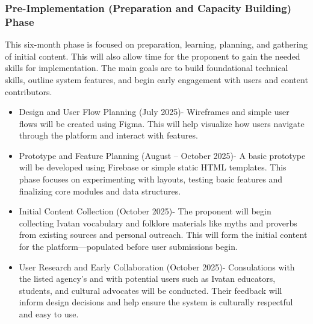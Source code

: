                 \subsubsection{Pre-Implementation (Preparation and Capacity Building) Phase}
                This six-month phase is focused on preparation, learning, planning, and gathering of initial content. This will also allow time for the proponent to gain the needed skills for implementation. The main goals are to build foundational technical skills, outline system features, and begin early engagement with users and content contributors.
                \begin{itemize}
                \item Design and User Flow Planning (July 2025)- Wireframes and simple user flows will be created using Figma. This will help visualize how users navigate through the platform and interact with features.
                \item Prototype and Feature Planning (August – October 2025)- A basic prototype will be developed using Firebase or simple static HTML templates. This phase focuses on experimenting with layouts, testing basic features and finalizing core modules and data structures.
                \item Initial Content Collection (October 2025)- The proponent will begin collecting Ivatan vocabulary and folklore materials like myths and proverbs from existing sources and personal outreach. This will form the initial content for the platform—populated before user submissions begin.
                \item User Research and Early Collaboration (October 2025)- Consulations with the listed agency’s and with potential users such as Ivatan educators, students, and cultural advocates will be conducted. Their feedback will inform design decisions and help ensure the system is culturally respectful and easy to use.
            \end{itemize}  

